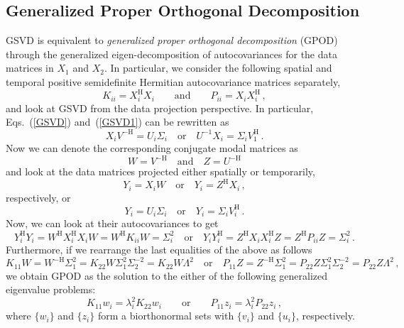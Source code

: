 \documentclass[10pt]{article}
\newcommand{\eqstwo}[2]{Eqs.\ (\ref{#1}) and~(\ref{#2})}
\begin{document}
\subsection{Generalized Proper Orthogonal Decomposition}
GSVD is equivalent to {\em generalized proper orthogonal decomposition} (GPOD) through the generalized eigen-decomposition of autocovariances for the data matrices in $X_1$ and $X_2$.
In particular, we consider the following spatial and temporal positive semidefinite Hermitian autocovariance matrices separately,
\begin{equation}
    K_{ii} = %
    X_i^\mathrm{H}X_i \qquad \mathrm{and} \qquad P_{ii} =  %
    X_iX_i^\mathrm{H}\,,
\end{equation}
and look at GSVD from the data projection perspective. 
In particular, \eqstwo{GSVD}{GSVD1} can be rewritten as
\begin{equation}\label{GSVD2}
    X_i  V^\mathrm{-H}= U_i \Sigma_{i} \quad \mathrm{or} \quad      U^{-1} X_i = \Sigma_{i} V_1^\mathrm{H}\,.
\end{equation}
Now we can denote the corresponding conjugate modal matrices as
\begin{equation}
    W =  V^\mathrm{-H} \quad \mathrm{and} \quad Z =  U^\mathrm{-H}
\end{equation}
and look at the data matrices projected either spatially or temporarily,
\begin{equation}
    Y_i = X_i W \quad \mathrm{or} \quad Y_i = Z^\mathrm{H}X_i \,,
\end{equation}
respectively, or
\begin{equation}
    Y_i = U_i\Sigma_i \quad \mathrm{or} \quad Y_i = \Sigma_i V_i^\mathrm{H} \,.
\end{equation}
Now, we can look at their autocovariances to get
\begin{equation}
    Y_i^\mathrm{H} Y_i = W^\mathrm{H}X_i^\mathrm{H}X_iW = W^\mathrm{H}K_{ii}W = \Sigma_i^2\quad \mathrm{or} \quad Y_i Y_i^\mathrm{H} = Z^\mathrm{H}X_iX_i^\mathrm{H}Z = Z^\mathrm{H}P_{ii}Z = \Sigma_i^2\,.
\end{equation}
Furthermore, if we rearrange the last equalities of the above as follows
\begin{equation}
    K_{11}W = W^\mathrm{-H}\Sigma_1^2 = K_{22} W \Sigma_1^2\Sigma_2^{-2}= K_{22} W \Lambda^2 \quad \mathrm{or} \quad P_{11}Z = Z^\mathrm{-H}\Sigma_1^2 = P_{22} Z \Sigma_1^2\Sigma_2^{-2}= P_{22} Z \Lambda^2\,,
\end{equation}
we obtain GPOD as the solution to the either of the following generalized eigenvalue problems:
\begin{equation}
    K_{11} w_i = \lambda_{i}^2 K_{22} w_i \qquad \mathrm{or} \qquad P_{11} z_i= \lambda_{i}^2 P_{22} z_i\,,
\end{equation}
where $\{w_i\}$ and $\{z_i\}$ form a biorthonormal sets with $\{v_i\}$ and $\{u_i\}$, respectively.
\end{document}
